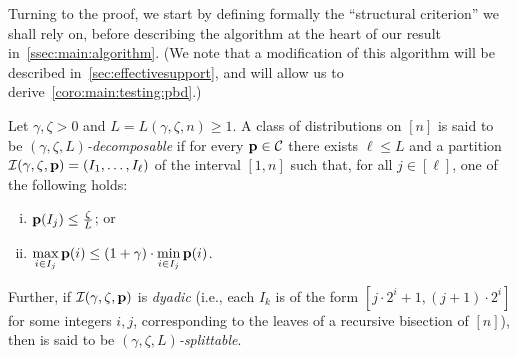 \noindent Turning to the proof, we start by defining formally the ``structural criterion'' we shall rely on, before describing the algorithm at the heart of our result in~\cref{ssec:main:algorithm}. (We note that a modification of this algorithm will be described in~\cref{sec:effectivesupport}, and will allow us to derive~\cref{coro:main:testing:pbd}.)

\begin{definition}[Decompositions]\label{def:struct:dec:split}
Let $\gamma,  \zeta > 0$ and $L=L(\gamma,\zeta,n)\geq 1$.  A class of distributions \class on $[n]$ is said to be \emph{$(\gamma,\zeta,L)$-decomposable} if for every $\mathbf{p}\in\mathcal{C}$ there exists $\ell \leq L$ and a partition $\mathcal{I}(\gamma,\zeta,\mathbf{p})=(I_1,\dots,I_\ell)$ of the interval $[1,n]$ such that, for all $j\in[\ell]$, one of the following holds:
\begin{enumerate}[(i)]
  \item\label{def:struct:item:light}  $\mathbf{p}(I_j) \leq \frac{\zeta}{L}$; or 
  \item\label{def:struct:item:flat} $\displaystyle \max_{i \in I_j} \mathbf{p}(i)\leq  (1+\gamma)\cdot \min_{i \in I_j} \mathbf{p}(i)$.
\end{enumerate}
Further, if $\mathcal{I}(\gamma,\zeta,\mathbf{p})$ is \emph{dyadic} (i.e., each $I_k$ is of the form $[j\cdot 2^i+1,(j+1)\cdot 2^i]$ for some integers $i,j$, corresponding to the leaves of a recursive bisection of $[n]$), then \class is said to be \emph{$(\gamma,\zeta,L)$-splittable}.
\end{definition}

